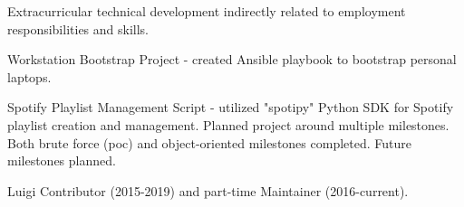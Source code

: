Extracurricular technical development indirectly related to employment responsibilities and skills.

\begin{zitemize}
    \item Workstation Bootstrap Project - created Ansible playbook to bootstrap personal laptops.
    \item Spotify Playlist Management Script - utilized "spotipy" Python SDK for Spotify playlist creation and management. Planned project around multiple milestones. Both brute force (poc) and object-oriented milestones completed. Future milestones planned.
    \item Luigi Contributor (2015-2019) and part-time Maintainer (2016-current).
\end{zitemize}

\vspace{5pt}
